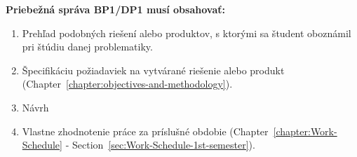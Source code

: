 \newpage
\textbf{Priebežná správa BP1/DP1 musí obsahovať:}
\begin{enumerate}
    \item Prehľad podobných riešení alebo produktov, s ktorými sa študent oboznámil pri štúdiu danej problematiky.
    \item Špecifikáciu požiadaviek na vytvárané riešenie alebo produkt
            (Chapter~\ref{chapter:objectives-and-methodology}).
    \item Návrh
    \item Vlastne zhodnotenie práce za príslušné obdobie 
            (Chapter~\ref{chapter:Work-Schedule} - 
            Section~\ref{sec:Work-Schedule-1st-semester}).
\end{enumerate}
